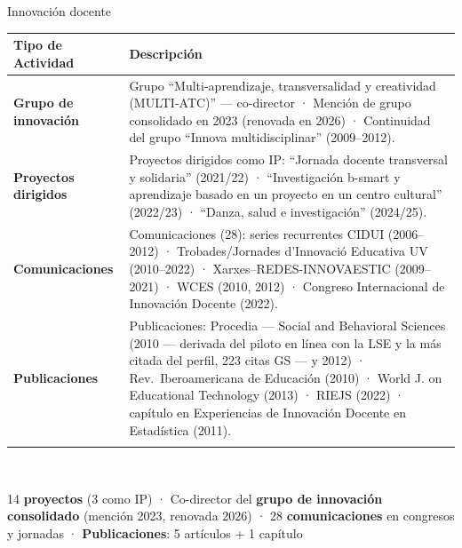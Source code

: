 \documentclass[
  8pt,
  ignorenonframetext,
  aspectratio=169,
  spanish,
]{beamer}
\newcommand{\lightrowrule}{\arrayrulecolor{black!25}\specialrule{0.4pt}{1pt}{1pt}\arrayrulecolor{black}}
\begin{document}
\begin{frame}[shrink]{Innovación docente}
\label{innovaciuxf3n-docente}
~

\begin{longtable}[]{@{}
  >{\raggedright\arraybackslash}p{}
  >{\raggedright\arraybackslash}p{}@{}}
\toprule\noalign{}
\begin{minipage}[b]{\linewidth}\raggedright
Tipo de Actividad
\end{minipage} & \begin{minipage}[b]{\linewidth}\raggedright
Descripción
\end{minipage} \\
\midrule\noalign{}
\endhead
\bottomrule\noalign{}
\endlastfoot
\textbf{Grupo de innovación} & Grupo ``Multi-aprendizaje,
transversalidad y creatividad (MULTI-ATC)'' --- co-director · Mención de
grupo consolidado en 2023 (renovada en 2026) · Continuidad del grupo
``Innova multidisciplinar'' (2009--2012). \\ \lightrowrule
\textbf{Proyectos dirigidos} & Proyectos dirigidos como IP: ``Jornada
docente transversal y solidaria'' (2021/22) · ``Investigación b-smart y
aprendizaje basado en un proyecto en un centro cultural'' (2022/23) ·
``Danza, salud e investigación'' (2024/25). \\ \lightrowrule
\textbf{Comunicaciones} & Comunicaciones (28): series recurrentes CIDUI
(2006--2012) · Trobades/Jornades d'Innovació Educativa UV (2010--2022) ·
Xarxes--REDES-INNOVAESTIC (2009--2021) · WCES (2010, 2012) · Congreso
Internacional de Innovación Docente (2022). \\ \lightrowrule
\textbf{Publicaciones} & Publicaciones: Procedia --- Social and
Behavioral Sciences (2010 --- derivada del piloto en línea con la LSE y
la más citada del perfil, 223 citas GS --- y 2012) · Rev.~Iberoamericana
de Educación (2010) · World J. on Educational Technology (2013) · RIEJS
(2022) · capítulo en Experiencias de Innovación Docente en Estadística
(2011). \\ \lightrowrule
\end{longtable}

~

14 \textbf{proyectos} (3 como IP) · Co-director del \textbf{grupo de
innovación consolidado} (mención 2023, renovada 2026) · 28
\textbf{comunicaciones} en congresos y jornadas ·
\textbf{Publicaciones}: 5 artículos + 1 capítulo

\end{frame}
\end{document}
